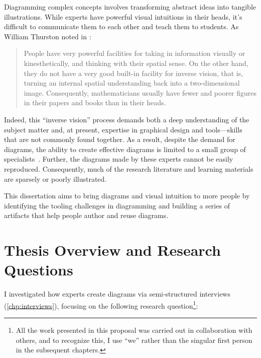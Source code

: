 Diagramming complex concepts involves transforming abstract ideas into tangible illustrations. While experts have powerful visual intuitions in their heads, it's difficult to communicate them to each other and teach them to students. As William Thurston noted in :

\begin{quote}
   People have very powerful facilities for taking in information visually or kinesthetically, and thinking with their spatial sense. On the other hand, they do not have a very good built-in facility for inverse vision, that is, turning an internal spatial understanding back into a two-dimensional image. Consequently, mathematicians usually have fewer and poorer figures in their papers and books than in their heads.~\cite[p. 164]{thurston_proof_1994}
\end{quote}

\noindent
Indeed, this ``inverse vision'' process demands both a deep understanding of the subject matter and, at present, expertise in graphical design and tools---skills that are not commonly found together. As a result, despite the demand for diagrams, the ability to create effective diagrams is limited to a small group of specialists~\cite{coulon_importance_2024}. Further, the diagrams made by these experts cannot be easily reproduced. Consequently, much of the research literature and learning materials are sparsely or poorly illustrated.

This dissertation aims to bring diagrams and visual intuition to more people by identifying the tooling challenges in diagramming and building a series of artifacts that help people author and reuse diagrams.

\section{Thesis Overview and Research Questions}

I investigated how experts create diagrams via semi-structured interviews (\cref{chp:interviews}), focusing on the following research question\footnote{All the work presented in this proposal was carried out in collaboration with others, and to recognize this, I use ``we'' rather than the singular first person in the subsequent chapters.}:

\label{rq:diagrammer}

